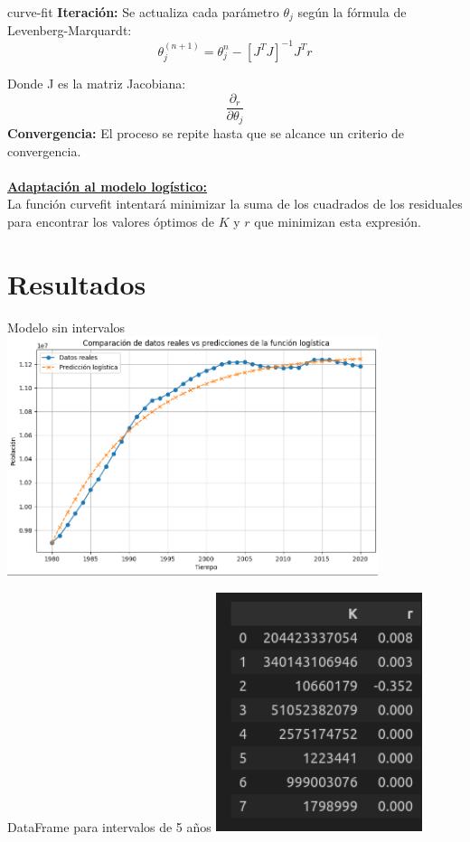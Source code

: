 \documentclass{beamer}
\begin{document}
\begin{frame}{curve-fit}
    \textbf{Iteración:} Se actualiza cada parámetro $\theta_{j}$ según la fórmula de Levenberg-Marquardt:\\
    $$\theta_{j}^{(n+1)} = \theta_{j}^{n} - [J^{T} J]^{-1} J^{T} r $$

    Donde J es la matriz Jacobiana: $$\frac{\partial_{r}}{\partial \theta_{j}}$$
    \textbf{Convergencia:} El proceso se repite hasta que se alcance un criterio de convergencia.\\ \\
    \underline{\large{\textbf{Adaptación al modelo logístico: }}}\\
    La función curvefit intentará minimizar la suma de los cuadrados de los residuales para encontrar los valores óptimos de $K$ y $r$ que minimizan esta expresión. 
\end{frame}
\section{Resultados}
\begin{frame}{Modelo sin intervalos}
    \includegraphics[height = 7cm]{img/graph_img/reales_vs_logistic.png}
\end{frame} 

\begin{frame}{DataFrame para intervalos de 5 años}
    \includegraphics[height = 7cm]{img/graph_img/df5.png}
\end{frame} 
\end{document}
